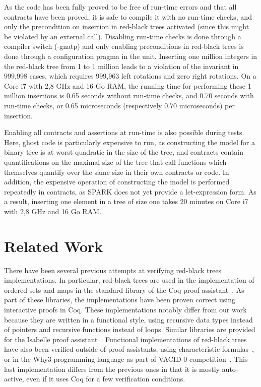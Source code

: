 \documentclass{llncs}
\begin{document}
As the code has been fully proved to be free of run-time errors and that all
contracts have been proved, it is safe to compile it with no run-time checks,
and only the precondition on insertion in red-black trees activated (since this
might be violated by an external call). Disabling run-time checks is done
through a compiler switch (-gnatp) and only enabling preconditions in red-black
trees is done through a configuration pragma in the unit. Inserting one million
integers in the red-black tree from 1 to 1 million leads to a violation of the
invariant in 999,998 cases, which requires 999,963 left rotations and zero
right rotations. On a Core i7 with 2,8 GHz and 16 Go RAM, the running time for
performing these 1 million insertions is 0.65 seconds without run-time checks,
and 0.70 seconds with run-time checks, or 0.65 microseconds (respectively 0.70
microseconds) per insertion.

Enabling all contracts and assertions at run-time is also possible during
tests. Here, ghost code is particularly expensive to run, as constructing the
model for a binary tree is at worst quadratic in the size of the tree, and
contracts contain quantifications on the maximal size of the tree that call
functions which themselves quantify over the same size in their own contracts
or code. In addition, the expensive operation of constructing the model is
performed repeatedly in contracts, as SPARK does not yet provide a
let-expression form.  As a result, inserting one element in a tree of size one
takes 20 minutes on Core i7 with 2,8 GHz and 16 Go RAM.

\section{Related Work}
\label{related-work}
There have been several previous attempts at verifying red-black trees implementations. In particular, red-black trees are
used in the implementation of ordered sets and maps in the standard library of the Coq proof
assistant~\cite{appel2011efficient,filliatre2004functors}. As part of these libraries, the implementations have been proven
correct using interactive proofs in Coq. These implementations notably differ from our work because they are written in
a functional style, using recursive data types instead of pointers and recursive functions instead of loops. Similar
libraries are provided for the Isabelle proof assistant~\cite{lammich2010isabelle}. Functional implementations of
red-black trees have also been verified outside of proof assistants, using characteristic formulas~\cite{chargueraud2010program},
or in the Why3 programming language as part of VACID-0 competition~\cite{leino2010vacid}. This last implementation differs from
the previous ones in that it is mostly auto-active, even if it uses Coq for a few verification conditions.
\end{document}
